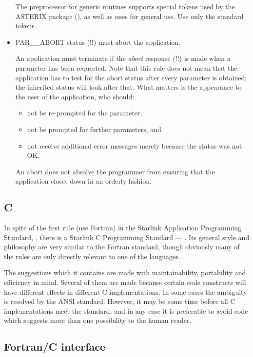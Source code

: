 \begin{itemize}
The preprocessor for generic routines supports special tokens used by the
\mbox{ASTERIX} package (), as well as ones for general
use.
Use only the standard tokens.

\item PAR\_\_ABORT status (!!) must abort the application.

An application must terminate if the {\it abort} response (!!) is made when a
parameter has been requested.
Note that this rule does not mean that the application has to test for the abort
status after every parameter is obtained;  the inherited status will look after
that.
What matters is the appearance to the user of the application, who should:
\begin{itemize}
\item not be re-prompted for the parameter,
\item not be prompted for further parameters, and
\item not receive additional error messages merely because the status was not
 OK.
\end{itemize}
An abort does not absolve the programmer from ensuring that the application
 closes down in an orderly fashion.
\end{itemize}

\subsection{C}

In spite of the first rule (use Fortran) in the Starlink Application
Programming Standard,
, there is a Starlink C Programming Standard ---
.
Its general style and philosophy are very similar to the Fortran standard,
though obviously many of the rules are only directly relevant to one of the
languages.

The suggestions which it contains are made with maintainability, portability
and efficiency in mind.
Several of them are made because certain code constructs will have different
effects in different C implementations.
In some cases the ambiguity is resolved by the ANSI standard.
However, it may be some time before all C implementations meet the standard,
and in any case it is preferable to avoid code which suggests more than one
possibility to the human reader.

\subsection{Fortran/C interface}

